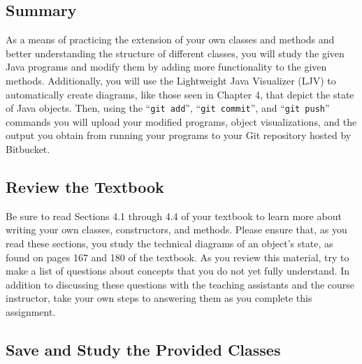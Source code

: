 



\subsection*{Summary}
\vspace*{-.05in}

As a means of practicing the extension of your own classes and methods and better understanding the structure of
different classes, you will study the given Java programs and modify them by adding more functionality to the given
methods.  Additionally, you will use the Lightweight Java Visualizer (LJV) to automatically create diagrams, like those
seen in Chapter 4, that depict the state of Java objects.  Then, using the ``{\tt git add}'', ``{\tt git commit}'', and
``{\tt git push}'' commands you will upload your modified programs, object visualizations, and the output you obtain
from running your programs to your Git repository hosted by Bitbucket.  

\vspace*{-.15in}
\subsection*{Review the Textbook}
\vspace*{-.05in}

Be sure to read Sections 4.1 through 4.4 of your textbook to learn more about writing your own classes, constructors, and
methods.  Please ensure that, as you read these sections, you study the technical diagrams of an object's state, as
found on pages 167 and 180 of the textbook. As you review this material, try to make a list of questions about concepts
that you do not yet fully understand.  In addition to discussing these questions with the teaching assistants and the
course instructor, take your own steps to answering them as you complete this assignment.

\vspace*{-.15in}
\subsection*{Save and Study the Provided Classes}
\vspace*{-.05in}


